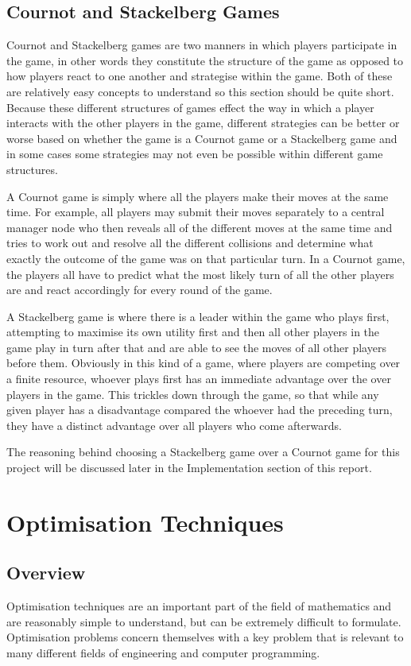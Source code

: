 \documentclass[a4paper, notitlepage]{report}
\begin{document}
\section{Cournot and Stackelberg Games}
\label{sec:org231e0a6}
Cournot and Stackelberg games are two manners in which players participate in
the game, in other words they constitute the structure of the game as opposed to
how players react to one another and strategise within the game. Both of these
are relatively easy concepts to understand so this section should be quite
short. Because these different structures of games effect the way in which a
player interacts with the other players in the game, different strategies can be
better or worse based on whether the game is a Cournot game or a Stackelberg
game and in some cases some strategies may not even be possible within different
game structures.

A Cournot game is simply where all the players make their moves at the same
time. For example, all players may submit their moves separately to a central
manager node who then reveals all of the different moves at the same time and
tries to work out and resolve all the different collisions and determine what
exactly the outcome of the game was on that particular turn. In a Cournot game,
the players all have to predict what the most likely turn of all the other
players are and react accordingly for every round of the game.

A Stackelberg game is where there is a leader within the game who plays first,
attempting to maximise its own utility first and then all other players in the
game play in turn after that and are able to see the moves of all other players
before them. Obviously in this kind of a game, where players are competing over
a finite resource, whoever plays first has an immediate advantage over the over
players in the game. This trickles down through the game, so that while any
given player has a disadvantage compared the whoever had the preceding turn,
they have a distinct advantage over all players who come afterwards.

The reasoning behind choosing a Stackelberg game over a Cournot game for this
project will be discussed later in the Implementation section of this report.
\chapter{Optimisation Techniques}
\label{sec:orge56819e}
\section{Overview}
\label{sec:org052160c}
Optimisation techniques are an important part of the field of mathematics and
are reasonably simple to understand, but can be extremely difficult to
formulate. Optimisation problems concern themselves with a key problem that is
relevant to many different fields of engineering and computer programming.
\end{document}
